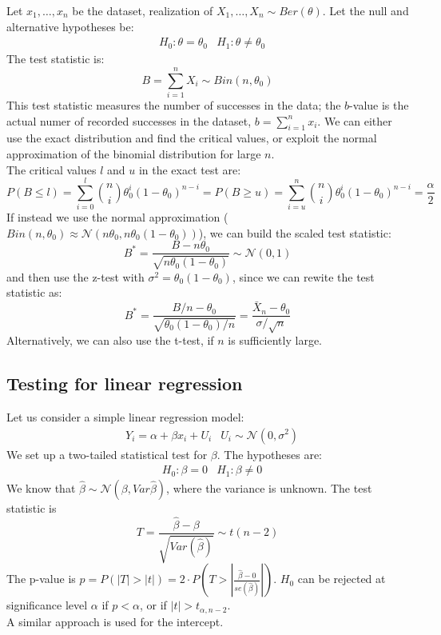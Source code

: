 Let $x_1, \ldots, x_n$ be the dataset, realization of $X_1, \ldots, X_n \sim Ber(\theta)$. Let the null and alternative hypotheses be:
\begin{align*}
    &H_0 : \theta = \theta_0 &H_1 : \theta \not = \theta_0
\end{align*}
The test statistic is:
\begin{equation*}
    B = \sum_{i=1}^n X_i \sim Bin(n, \theta_0)
\end{equation*}
This test statistic measures the number of successes in the data; the $b$-value is the actual numer of recorded successes in the dataset, $b = \sum_{i=1}^n x_i$. We can either use the exact distribution and find the critical values, or exploit the normal approximation of the binomial distribution for large $n$.\\
The critical values $l$ and $u$ in the exact test are:
\begin{equation*}
    P(B \leq l) = \sum_{i=0}^l \binom{n}{i} \theta^i_0 (1-\theta_0)^{n-i} = P(B \geq u) = \sum_{i=u}^n \binom{n}{i} \theta^i_0 (1-\theta_0)^{n-i} = \frac{\alpha}{2}
\end{equation*}
If instead we use the normal approximation ($Bin(n, \theta_0) \approx \mathcal{N}(n\theta_0, n\theta_0(1-\theta_0))$), we can build the scaled test statistic:
\begin{equation*}
    B^* = \frac{B - n\theta_0}{\sqrt{n\theta_0(1-\theta_0)}} \sim \mathcal{N}(0,1)
\end{equation*}
and then use the z-test with $\sigma^2 = \theta_0(1-\theta_0)$, since we can rewite the test statistic as:
\begin{equation*}
    B^* = \frac{B/n - \theta_0}{\sqrt{\theta_0(1-\theta_0)/n}} = \frac{\bar{X}_n - \theta_0}{\sigma / \sqrt{n}}
\end{equation*}
Alternatively, we can also use the t-test, if $n$ is sufficiently large.

\subsection{Testing for linear regression}

Let us consider a simple linear regression model:
\begin{align*}
    &Y_i = \alpha + \beta x_i + U_i &U_i \sim \mathcal{N}(0, \sigma^2)
\end{align*}
We set up a two-tailed statistical test for $\beta$. The hypotheses are:
\begin{align*}
    &H_0 : \beta = 0 &H_1 : \beta \not = 0
\end{align*}
We know that $\hat{\beta} \sim \mathcal{N}(\beta, Var{\hat{\beta}})$, where the variance is unknown. The test statistic is
\begin{equation*}
    T = \frac{\hat{\beta} - \beta}{\sqrt{Var(\hat{\beta})}} \sim t(n-2)
\end{equation*}
The p-value is $p = P(|T| > |t|) = 2 \cdot P\left(T > \left|\frac{\hat{\beta} - 0}{se(\hat{\beta})}\right|\right)$. $H_0$ can be rejected at significance level $\alpha$ if $p < \alpha$, or if $|t| > t_{\alpha, n-2}$. \\
A similar approach is used for the intercept.

